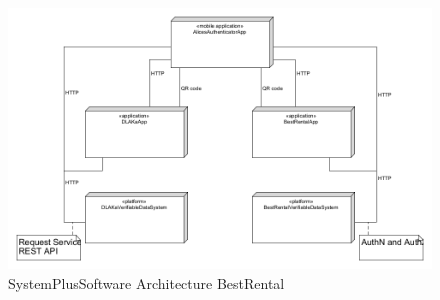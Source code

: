 \begin{figure}
	\centering
	\includegraphics[width=\textwidth]{figures/sps_BestRentalPOC.png}
	\caption{SystemPlusSoftware Architecture BestRental}
	\label{fig:sps_architecture_bestrental}
\end{figure}